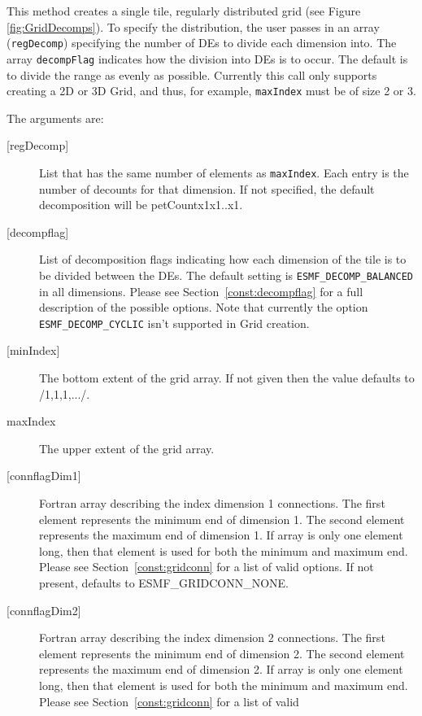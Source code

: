   
   This method creates a single tile, regularly distributed grid
   (see Figure \ref{fig:GridDecomps}).
   To specify the distribution, the user passes in an array
   ({\tt regDecomp}) specifying the number of DEs to divide each
   dimension into. The array {\tt decompFlag} indicates how the division into DEs is to
   occur.  The default is to divide the range as evenly as possible. Currently this call
   only supports creating a 2D or 3D Grid, and thus, for example, {\tt maxIndex} must be of size 2 or 3.
  
   The arguments are:
   \begin{description}
   \item[{[regDecomp]}]
        List that has the same number of elements as {\tt maxIndex}.
        Each entry is the number of decounts for that dimension.
        If not specified, the default decomposition will be petCountx1x1..x1.
   \item[{[decompflag]}]
        List of decomposition flags indicating how each dimension of the
        tile is to be divided between the DEs. The default setting
        is {\tt ESMF\_DECOMP\_BALANCED} in all dimensions. Please see
        Section~\ref{const:decompflag} for a full description of the
        possible options. Note that currently the option
        {\tt ESMF\_DECOMP\_CYCLIC} isn't supported in Grid creation.
   \item[{[minIndex]}]
        The bottom extent of the grid array. If not given then the value defaults
        to /1,1,1,.../.
   \item[maxIndex]
        The upper extent of the grid array.
   \item[{[connflagDim1]}]
        Fortran array describing the index dimension 1 connections.
        The first element represents the minimum end of dimension 1.
        The second element represents the maximum end of dimension 1.
        If array is only one element long, then that element is used
        for both the minimum and maximum end.
        Please see Section~\ref{const:gridconn} for a list of valid
        options. If not present, defaults to ESMF\_GRIDCONN\_NONE.
   \item[{[connflagDim2]}]
        Fortran array describing the index dimension 2 connections.
        The first element represents the minimum end of dimension 2.
        The second element represents the maximum end of dimension 2.
        If array is only one element long, then that element is used
        for both the minimum and maximum end.
        Please see Section~\ref{const:gridconn} for a list of valid

\end{description}
